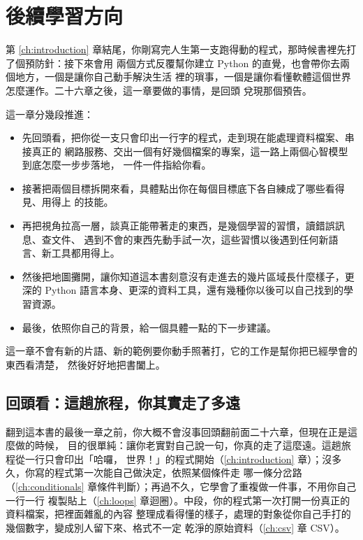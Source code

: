 \chapter{後續學習方向}
\label{ch:where-next}

第 \ref{ch:introduction} 章結尾，你剛寫完人生第一支跑得動的程式，那時候書裡先打了個預防針：接下來會用
兩個方式反覆幫你建立 Python 的直覺，也會帶你去兩個地方，一個是讓你自己動手解決生活
裡的瑣事，一個是讓你看懂軟體這個世界怎麼運作。二十六章之後，這一章要做的事情，是回頭
兌現那個預告。

這一章分幾段推進：

\begin{itemize}
    \item 先回頭看，把你從一支只會印出一行字的程式，走到現在能處理資料檔案、串接真正的
    網路服務、交出一個有好幾個檔案的專案，這一路上兩個心智模型到底怎麼一步步落地，
    一件一件指給你看。
    \item 接著把兩個目標拆開來看，具體點出你在每個目標底下各自練成了哪些看得見、用得上
    的技能。
    \item 再把視角拉高一層，談真正能帶著走的東西，是幾個學習的習慣，讀錯誤訊息、查文件、
    遇到不會的東西先動手試一次，這些習慣以後遇到任何新語言、新工具都用得上。
    \item 然後把地圖攤開，讓你知道這本書刻意沒有走進去的幾片區域長什麼樣子，更深的
    Python 語言本身、更深的資料工具，還有幾種你以後可以自己找到的學習資源。
    \item 最後，依照你自己的背景，給一個具體一點的下一步建議。
\end{itemize}

這一章不會有新的片語、新的範例要你動手照著打，它的工作是幫你把已經學會的東西看清楚，
然後好好地把書闔上。

\section{回頭看：這趟旅程，你其實走了多遠}
\label{sec:journey-recap}

翻到這本書的最後一章之前，你大概不會沒事回頭翻前面二十六章，但現在正是這麼做的時候，
目的很單純：讓你老實對自己說一句，你真的走了這麼遠。這趟旅程從一行只會印出「哈囉，
世界！」的程式開始（\ref{ch:introduction} 章）；沒多久，你寫的程式第一次能自己做決定，依照某個條件走
哪一條分岔路（\ref{ch:conditionals} 章條件判斷）；再過不久，它學會了重複做一件事，不用你自己一行一行
複製貼上（\ref{ch:loops} 章迴圈）。中段，你的程式第一次打開一份真正的資料檔案，把裡面雜亂的內容
整理成看得懂的樣子，處理的對象從你自己手打的幾個數字，變成別人留下來、格式不一定
乾淨的原始資料（\ref{ch:csv} 章 CSV）。

